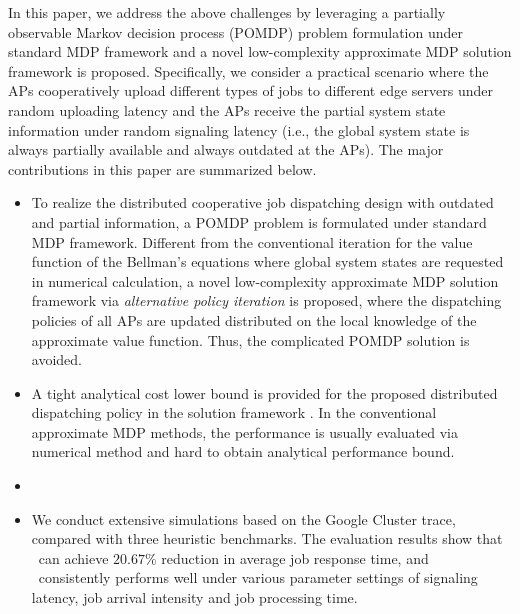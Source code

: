 In this paper, we address the above challenges by leveraging a partially observable Markov decision process (POMDP) problem formulation under standard MDP framework and a novel low-complexity approximate MDP solution framework is proposed.
Specifically, we consider a practical scenario where the APs cooperatively upload different types of jobs to different edge servers under random uploading latency and the APs receive the partial system state information under random signaling latency (i.e., the global system state is always partially available and always outdated at the APs).
The major contributions in this paper are summarized below.
\begin{itemize}
    \item To realize the distributed cooperative job dispatching design with outdated and partial information, a POMDP problem is formulated under standard MDP framework.
    Different from the conventional iteration for the value function of the Bellman's equations where global system states are requested in numerical calculation, a novel low-complexity approximate MDP solution framework via \emph{alternative policy iteration} is proposed, where the dispatching policies of all APs are updated distributed on the local knowledge of the approximate value function.
    Thus, the complicated POMDP solution is avoided.
    \item A tight analytical cost lower bound is provided for the proposed distributed dispatching policy in the solution framework \algname. In the conventional approximate MDP methods, the performance is usually evaluated via numerical method and hard to obtain analytical performance bound.
    \item {}
    \item We conduct extensive simulations based on the Google Cluster trace, compared with three heuristic benchmarks. The evaluation results show that \algname~can achieve $20.67\%$ reduction in average job response time, and \algname~consistently performs well under various parameter settings of signaling latency, job arrival intensity and job processing time. 
\end{itemize}

